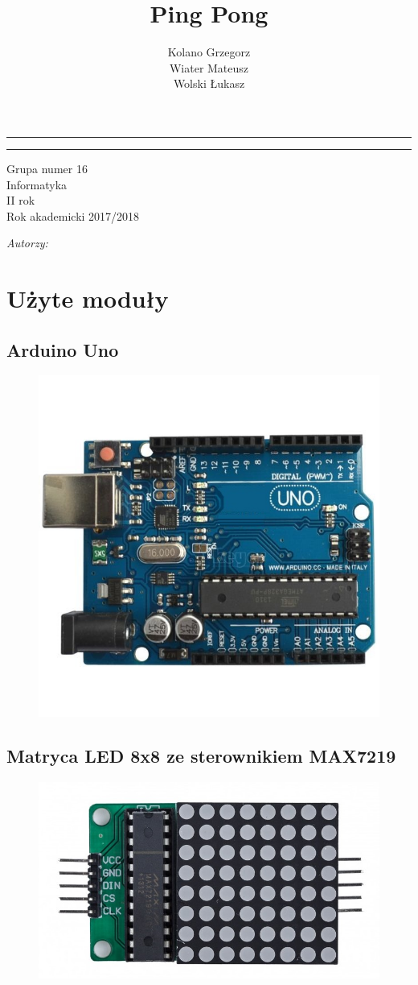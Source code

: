 \documentclass[12pt,notitlepage]{article}
\author{Kolano Grzegorz\\
	Wiater Mateusz\\
	Wolski Łukasz\\
}
\title{Ping Pong}
\makeatletter
\newcommand{\linia}{\rule{\linewidth}{0.4mm}}
\renewcommand{\maketitle}{\begin{titlepage}
    \noindent\linia
    \begin{center}
      \LARGE \textsc{\@title}
         \end{center}
     \linia
    \vspace{0.5cm}    
        \vspace*{1cm}
    \begin{center}\Large
    Grupa numer 16\\

Informatyka\\
II rok\\
Rok akademicki 2017/2018\\

    \end{center}

    \vspace{3cm}


	\begin{center}
	
    \begin{minipage}{6cm}
\begin{center}

    \textit{\normalsize Autorzy:}\\

\end{center}
    \Large \textsc{\@author} \par

    \end{minipage}

	\end{center}
    \vspace{5cm}




    \vspace*{\stretch{6}}

    \begin{center}

    \@date

    \end{center}

  \end{titlepage}%

}
\makeatother
\begin{document}
\maketitle

\newpage

\section{Użyte moduły}
\subsection{Arduino Uno}
\begin{figure}[h!]
  \includegraphics[width=\textwidth]{uno.jpg}
  \label{fig:uno}
\end{figure}
\newpage
\subsection{Matryca LED 8x8 ze sterownikiem MAX7219}
\begin{figure}[h!]
  \includegraphics[width=\textwidth]{matrix.jpg}
  \label{fig:matrix}
\end{figure}
\end{document}
